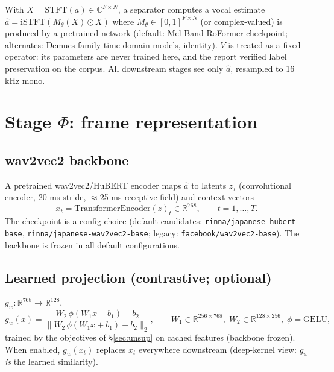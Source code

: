 \documentclass[10pt]{article}
\newcommand{\R}{\mathbb{R}}
\begin{document}
With $X = \mathrm{STFT}(a) \in \mathbb{C}^{F \times N}$, a separator computes a vocal estimate $\hat{a} = \mathrm{iSTFT}\!\left(M_\theta(X) \odot X\right)$ where $M_\theta \in [0,1]^{F\times N}$ (or complex-valued) is produced by a pretrained network (default: Mel-Band RoFormer checkpoint; alternates: Demucs-family time-domain models, identity). $V$ is treated as a fixed operator: its parameters are never trained here, and the report verified label preservation on the corpus. All downstream stages see only $\hat{a}$, resampled to 16 kHz mono.

\section{Stage $\Phi$: frame representation}\label{sec:features}

\subsection{wav2vec2 backbone}
A pretrained wav2vec2/HuBERT encoder maps $\hat a$ to latents $z_\tau$ (convolutional encoder, 20-ms stride, $\approx$25-ms receptive field) and context vectors
\begin{equation}
x_t = \mathrm{TransformerEncoder}(z)_t \in \R^{768}, \qquad t = 1,\dots,T .
\end{equation}
The checkpoint is a config choice (default candidates: \texttt{rinna/japanese-hubert-base}, \texttt{rinna/japanese-wav2vec2-base}; legacy: \texttt{facebook/wav2vec2-base}). The backbone is frozen in all default configurations.

\subsection{Learned projection (contrastive; optional)}\label{sec:proj}
$g_w: \R^{768} \to \R^{128}$,
\begin{equation}
g_w(x) = \frac{W_2\,\phi(W_1 x + b_1) + b_2}{\lVert W_2\,\phi(W_1 x + b_1) + b_2 \rVert_2},
\qquad W_1 \in \R^{256\times768},\; W_2 \in \R^{128\times256},\; \phi = \mathrm{GELU},
\end{equation}
trained by the objectives of \S\ref{sec:unsup} on cached features (backbone frozen). When enabled, $g_w(x_t)$ replaces $x_t$ everywhere downstream (deep-kernel view: $g_w$ \emph{is} the learned similarity).
\end{document}
